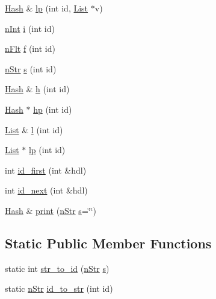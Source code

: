 \begin{DoxyCompactItemize}
\mbox{\hyperlink{classHash}{Hash}} \& \mbox{\hyperlink{classHash_a623be7d965b4d39b0094cead21870371}{lp}} (int id, \mbox{\hyperlink{classList}{List}} $\ast$v)
\item 
\mbox{\hyperlink{Node_8h_a17693eab3c96e5b590641f884a5a6ff1}{n\+Int}} \mbox{\hyperlink{classHash_af608cf780ab2cc8208eb0c1c5aa24a4a}{i}} (int id)
\item 
\mbox{\hyperlink{Node_8h_aa7fdace1cf021510d341a4ce92e2223a}{n\+Flt}} \mbox{\hyperlink{classHash_a9f2fb14f83d560b357e72b422c234a92}{f}} (int id)
\item 
\mbox{\hyperlink{Node_8h_a0d7591b97fcccd83c3c2ce469c8bc25c}{n\+Str}} \mbox{\hyperlink{classHash_a992f2b8da6333dc7155837e27fbeba43}{s}} (int id)
\item 
\mbox{\hyperlink{classHash}{Hash}} \& \mbox{\hyperlink{classHash_a74a0418b4b414b46743117a241c61979}{h}} (int id)
\item 
\mbox{\hyperlink{classHash}{Hash}} $\ast$ \mbox{\hyperlink{classHash_abb7606f3a1a958bd23a4485ac66130b0}{hp}} (int id)
\item 
\mbox{\hyperlink{classList}{List}} \& \mbox{\hyperlink{classHash_a130b1cdaf17b474fbb43f6534a9b93f9}{l}} (int id)
\item 
\mbox{\hyperlink{classList}{List}} $\ast$ \mbox{\hyperlink{classHash_abb8fdac7c0c4e3e7853f8f6b453ecc2f}{lp}} (int id)
\item 
int \mbox{\hyperlink{classHash_aa44116e6a086026ef24ddd2c15c9f83a}{id\+\_\+first}} (int \&hdl)
\item 
int \mbox{\hyperlink{classHash_a24f1be32cbdf92d9a4367bd006a04121}{id\+\_\+next}} (int \&hdl)
\item 
\mbox{\hyperlink{classHash}{Hash}} \& \mbox{\hyperlink{classHash_a52122eb03d98b9ca5a83ad3b4e6cb84b}{print}} (\mbox{\hyperlink{Node_8h_a0d7591b97fcccd83c3c2ce469c8bc25c}{n\+Str}} \mbox{\hyperlink{classHash_a3a556ff261a5f28ba38fd404cb8335b9}{s}}=\char`\"{}\char`\"{})
\end{DoxyCompactItemize}
\subsection*{Static Public Member Functions}
\begin{DoxyCompactItemize}
\item 
static int \mbox{\hyperlink{classHash_abf1b1f76adfd20925d2d0b4c4b8d5a8f}{str\+\_\+to\+\_\+id}} (\mbox{\hyperlink{Node_8h_a0d7591b97fcccd83c3c2ce469c8bc25c}{n\+Str}} \mbox{\hyperlink{classHash_a3a556ff261a5f28ba38fd404cb8335b9}{s}})
\item 
static \mbox{\hyperlink{Node_8h_a0d7591b97fcccd83c3c2ce469c8bc25c}{n\+Str}} \mbox{\hyperlink{classHash_a7714f30421720c111bfee3c6773cf414}{id\+\_\+to\+\_\+str}} (int id)
\end{DoxyCompactItemize}


